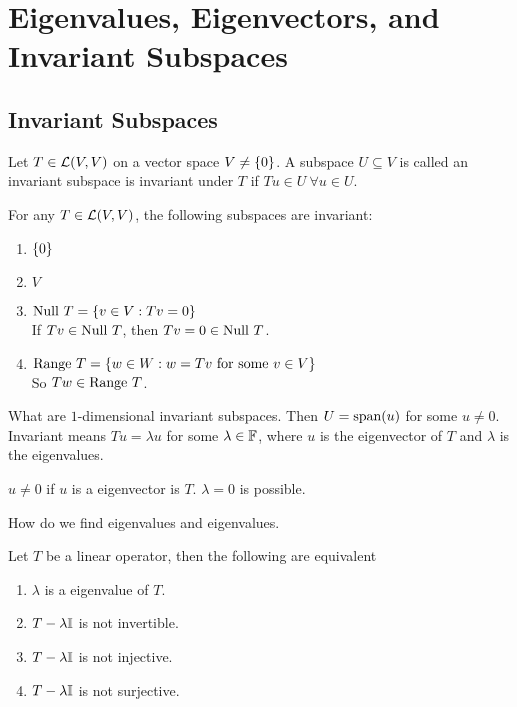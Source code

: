 \section{Eigenvalues, Eigenvectors, and
Invariant Subspaces}
\subsection{Invariant Subspaces}
\begin{definition}
    Let $T \in \mathcal L(V,V)$ on a vector space $V \neq \left\{ 0 \right\}$. A subspace $U \subseteq V$ is called an invariant subspace is invariant under $T$ if $Tu \in U \ \forall u \in U$.
\end{definition}
\begin{example}
    For any $T \in \mathcal L(V,V)$, the following subspaces are invariant:
    \begin{enumerate}
        \item $\left\{ 0 \right\}$
        \item $V$
        \item $\text{Null } T = \left\{ v \in V : Tv = 0 \right\}$ \\
        If $Tv \in \text{Null } T$, then $Tv = 0 \in \text{Null } T$.
        \item $\text{Range } T = \left\{ w \in W : w = Tv \text{ for some } v \in V \right\}$ \\
        So $Tw \in \text{Range } T$.
    \end{enumerate}
\end{example}
\begin{question}
    What are $1$-dimensional invariant subspaces. Then $U = \text{span}(u)$ for some $u \neq 0$. Invariant means $Tu = \lambda u$ for some $\lambda \in  \mathbb F$, where $u$ is the eigenvector of $T$ and $\lambda$ is the eigenvalues. 
\end{question}
\begin{remark}
    $u \neq 0$ if $u$ is a eigenvector is $T$. $\lambda = 0$ is possible.
\end{remark}
\begin{question}
    How do we find eigenvalues and eigenvalues.
\end{question}
\begin{proposition} Let $T$ be a linear operator, then the following are equivalent
\begin{enumerate}
    \item $\lambda$ is a eigenvalue of $T$.
    \item $T - \lambda\mathbb I$ is not invertible.
    \item $T - \lambda \mathbb I$ is not injective.
    \item $T - \lambda \mathbb I$ is not surjective.
\end{enumerate}
\end{proposition}